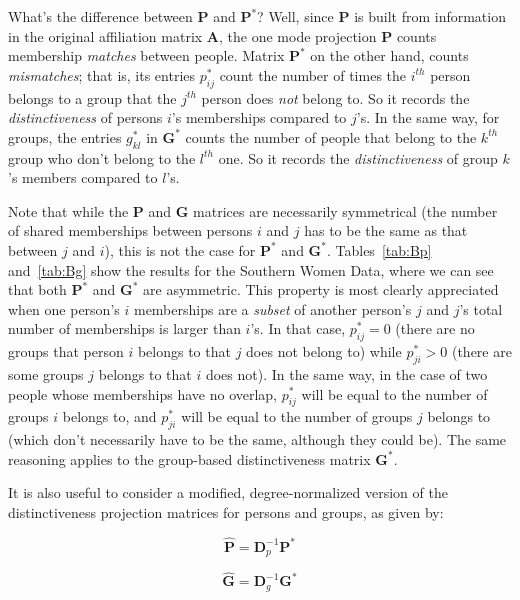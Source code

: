 \documentclass[a4paper,fleqn]{cas-sc}
\begin{document}
What's the difference between $\mathbf{P}$ and $\mathbf{P^*}$? Well, since $\mathbf{P}$ is built from information in the original affiliation matrix $\mathbf{A}$, the one mode projection $\mathbf{P}$ counts membership \textit{matches} between people. Matrix $\mathbf{P^*}$ on the other hand, counts \textit{mismatches}; that is, its entries $p^*_{ij}$ count the number of times the $i^{th}$ person belongs to a group that the $j^{th}$ person does \textit{not} belong to. So it records the \textit{distinctiveness} of persons $i$'s memberships compared to $j$'s. In the same way, for groups, the entries $g^*_{kl}$ in $\mathbf{G^*}$ counts the number of people that belong to the $k^{th}$ group who don't belong to the $l^{th}$ one. So it records the \textit{distinctiveness} of group $k$'s members compared to $l$'s. 




Note that while the $\mathbf{P}$ and $\mathbf{G}$ matrices are necessarily symmetrical (the number of shared memberships between persons $i$ and $j$ has to be the same as that between $j$ and $i$), this is not the case for $\mathbf{P^*}$ and $\mathbf{G^*}$. Tables~\ref{tab:Bp} and~\ref{tab:Bg} show the results for the Southern Women Data, where we can see that both $\mathbf{P^*}$ and $\mathbf{G^*}$ are asymmetric. This property is most clearly appreciated when one person's $i$ memberships are a \textit{subset} of another person's $j$ and $j$'s total number of memberships is larger than $i$'s. In that case, $p^*_{ij} = 0$ (there are no groups that person $i$ belongs to that $j$ does not belong to) while $p^*_{ji} > 0$ (there are some groups $j$ belongs to that $i$ does not). In the same way, in the case of two people whose memberships have no overlap, $p^*_{ij}$ will be equal to the number of groups $i$ belongs to, and $p^*_{ji}$ will be equal to the number of groups $j$ belongs to (which don't necessarily have to be the same, although they could be).  The same reasoning applies to the group-based distinctiveness matrix $\mathbf{G^*}$.

It is also useful to consider a modified, degree-normalized version of the distinctiveness projection matrices for persons and groups, as given by: 

\begin{equation}
    \hat{\textbf{P}} = \textbf{D}_p^{-1}\textbf{P}^*
\end{equation}

\begin{equation}
    \hat{\textbf{G}} = \textbf{D}_g^{-1}\textbf{G}^*
\end{equation}
\end{document}
